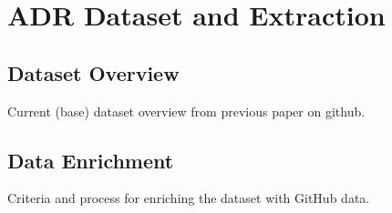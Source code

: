 \chapter{ADR Dataset and Extraction}
    \section{Dataset Overview}
        Current (base) dataset overview from previous paper on github.
    \section{Data Enrichment}
        Criteria and process for enriching the dataset with GitHub data.